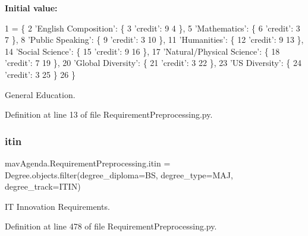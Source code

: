 {\bfseries Initial value\+:}
\begin{DoxyCode}
1 =  \{
2     \textcolor{stringliteral}{'English Composition'}: \{
3         \textcolor{stringliteral}{'credit'}: 9
4     \},
5     \textcolor{stringliteral}{'Mathematics'}: \{
6         \textcolor{stringliteral}{'credit'}: 3
7     \},
8     \textcolor{stringliteral}{'Public Speaking'}: \{
9         \textcolor{stringliteral}{'credit'}: 3
10     \},
11     \textcolor{stringliteral}{'Humanities'}: \{
12         \textcolor{stringliteral}{'credit'}: 9
13     \},
14     \textcolor{stringliteral}{'Social Science'}: \{
15         \textcolor{stringliteral}{'credit'}: 9
16     \},
17     \textcolor{stringliteral}{'Natural/Physical Science'}: \{
18         \textcolor{stringliteral}{'credit'}: 7
19     \},
20     \textcolor{stringliteral}{'Global Diversity'}: \{
21         \textcolor{stringliteral}{'credit'}: 3
22     \},
23     \textcolor{stringliteral}{'US Diversity'}: \{
24         \textcolor{stringliteral}{'credit'}: 3
25     \}
26 \}
\end{DoxyCode}


General Education. 



Definition at line 13 of file Requirement\+Preprocessing.\+py.

\mbox{\label{namespacemavAgenda_1_1RequirementPreprocessing_ae97c34915a96370651628305d87909c2}} 
\subsubsection{\texorpdfstring{itin}{itin}}
{\footnotesize\ttfamily mav\+Agenda.\+Requirement\+Preprocessing.\+itin = Degree.\+objects.\+filter(degree\+\_\+diploma=\textquotesingle{}BS\textquotesingle{}, degree\+\_\+type=\textquotesingle{}M\+AJ\textquotesingle{}, degree\+\_\+track=\textquotesingle{}I\+T\+IN\textquotesingle{})}



IT Innovation Requirements. 



Definition at line 478 of file Requirement\+Preprocessing.\+py.

\mbox{\label{namespacemavAgenda_1_1RequirementPreprocessing_ac0a28a38bf1a9adfddfb79876e568219}} 
